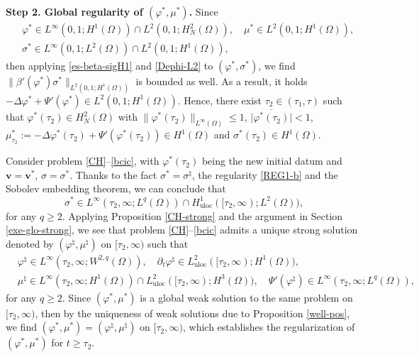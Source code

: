 \documentclass[11pt,reqno]{amsart}
\def\vv{\bm{v}}
\begin{document}
\textbf{Step 2. Global regularity of $(\varphi^*,\mu^*)$.}
Since
\begin{align*}
&\varphi^* \in L^\infty(0,1;H^1(\Omega))\cap L^2(0,1; H_N^2(\Omega)),\quad
\mu^*\in L^2(0,1; H^1(\Omega)),
\\
&\sigma^*\in L^\infty(0,1;L^2(\Omega))\cap L^2(0,1;H^1(\Omega)),
\end{align*}
then applying \eqref{es-beta-sigH1} and \eqref{Dephi-L2} to $(\varphi^*,\sigma^*)$, we find $\|\beta'(\varphi^*)\sigma^*\|_{L^2(0,1;H^1(\Omega))}$ is bounded as well. As a result, it holds $-\Delta \varphi^*+\Psi'(\varphi^*)\in L^2(0,1;H^1(\Omega))$. Hence, there exist $\tau_2\in (\tau_1,\tau)$ such that $\varphi^*(\tau_2) \in H^2_N(\Omega)$ with
	$\| \varphi^*(\tau_2)\|_{L^\infty(\Omega)}\leq 1$, $\big|\overline{\varphi^*(\tau_2)}\big|<1$, $\mu^*_{\tau_2}:=-\Delta \varphi^*(\tau_2)+\Psi'(\varphi^*(\tau_2)) \in H^1(\Omega)$ and $\sigma^*(\tau_2)\in H^1(\Omega)$.

Consider problem \eqref{CH}--\eqref{bcic}, with $\varphi^*(\tau_2)$ being the new initial datum and $\vv=\vv^*$, $\sigma=\sigma^*$. Thanks to the fact $\sigma^*=\sigma^\natural$, the regularity \eqref{REG1-b} and the Sobolev embedding theorem, we can conclude  that
$$
\sigma^* \in L^{\infty}(\tau_2,\infty;L^q(\Omega))\cap H^1_{\mathrm{uloc}}([\tau_2,\infty);L^2(\Omega)),
$$ for any $q\geq 2$.
Applying Proposition \ref{CH-strong} and the argument in Section \ref{exe-glo-strong}, we see that problem \eqref{CH}--\eqref{bcic} admits a unique strong solution denoted by  $(\varphi^\natural,\mu^\natural)$ on $[\tau_2,\infty)$ such that
%
\begin{equation}
\label{REG-b}
\begin{split}
&\varphi^\natural \in L^\infty(\tau_2,\infty;W^{2,q}(\Omega)), \quad \partial_t \varphi^\natural \in L^2_{\mathrm{uloc}}([\tau_2,\infty);H^1(\Omega)),\\
&\mu^\natural \in L^{\infty}(\tau_2,\infty; H^1(\Omega))\cap L^2_{\mathrm{uloc}}([\tau_2,\infty);H^3(\Omega)),
\quad\Psi'(\varphi^\natural) \in L^\infty(\tau_2,\infty; L^q(\Omega)),
\end{split}
\end{equation}
%
for any $q\geq 2$. Since $(\varphi^*,\mu^*)$ is a global weak solution to the same problem on $[\tau_2,\infty)$, then by the uniqueness of weak solutions due to Proposition \ref{well-pos}, we find $(\varphi^*,\mu^*)=(\varphi^\natural,\mu^\natural)$ on $[\tau_2,\infty)$, which establishes the regularization of $(\varphi^*,\mu^*)$ for $t\geq \tau_2$.
\end{document}
